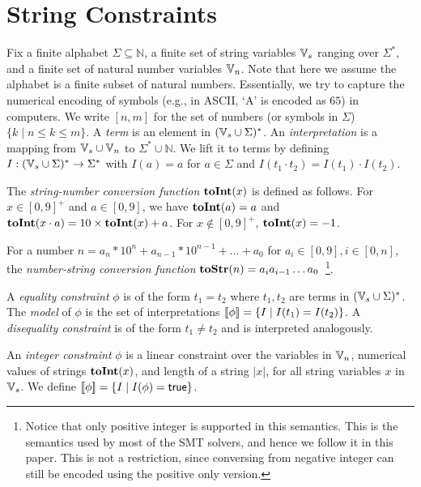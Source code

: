 \documentclass{llncs}
\begin{document}
\section{String Constraints} \label{section:sc}
Fix a finite alphabet $\Sigma \subseteq \mathbb{N}$, a finite set of string variables $\mbox{$\mathbb{V}_s$}$ ranging over $\Sigma^*$, and a finite set of natural number variables $\mbox{$\mathbb{V}_n$}$. Note that here we assume the alphabet is a finite subset of natural numbers. Essentially, we try to capture the numerical encoding of symbols (e.g., in ASCII, `A' is encoded as $65$) in computers. We write $[n,m]$ for the set of numbers (or symbols in $\Sigma$) $\{k\mid n\leq k \leq m\}$. A \emph{term} is an element in $(\mbox{$\mathbb{V}_s$}\cup \Sigma)^*$. An \emph{interpretation} is a mapping from $\mbox{$\mathbb{V}_s$}\cup \mbox{$\mathbb{V}_n$}$ to $\Sigma^* \cup \mathbb{N}$. We lift 
it to terms by defining $I: (\mbox{$\mathbb{V}_s$}\cup \Sigma)^* \rightarrow \Sigma^*$ with $I(a) =a$ for $a\in \Sigma$ and $I(t_1 \cdot t_2) = I(t_1)\cdot I(t_2)$. 

The \emph{string-number conversion function} $\mbox{\textbf{toInt}($x$)}$ is defined as follows. For $x\in [0,9]^+$ and $a\in [0,9]$, we have $\mbox{\textbf{toInt}($a$)}=a$ and $\mbox{\textbf{toInt}($x\cdot a$)} = 10\times \mbox{\textbf{toInt}($x$)}+a$. For $x\notin [0,9]^+$, $\mbox{\textbf{toInt}($x$)}=-1$. 

For a number $n=a_n*10^n+a_{n-1}*10^{n-1}+\ldots+a_0$ for $a_i\in [0,9], i\in [0,n]$, the \emph{number-string conversion function} $\mbox{\textbf{toStr}($n$)}=a_ia_{i-1}\ldots a_0$~\footnote{Notice that only positive integer is supported in this semantics. This is the semantics used by most of the SMT solvers, and hence we follow it in this paper. This is not a restriction, since conversing from negative integer can still be encoded using the positive only version.}.

A \emph{equality constraint} $\phi$ is of the form $t_1 = t_2$ where $t_1, 
t_2$ are terms in $(\mbox{$\mathbb{V}_s$}\cup \Sigma)^*$. The \emph{model} of $\phi$ is the set of interpretations $[\![\phi]\!]=\{I\mid 
I(t_1)=I(t_2)\}$. A \emph{disequality constraint} is of the form $t_1 \neq 
t_2$ and is interpreted analogously.

An \emph{integer constraint} $\phi$ is a linear constraint over the variables in $\mbox{$\mathbb{V}_n$}$, numerical values of strings $\mbox{\textbf{toInt}($x$)}$, and length of a string $|x|$, for all string variables $x$ in $\mbox{$\mathbb{V}_s$}$.
We define  $[\![\phi]\!]= \{I \mid I(\phi)= \mbox{$\mathsf{true}$} \}$.
\end{document}
